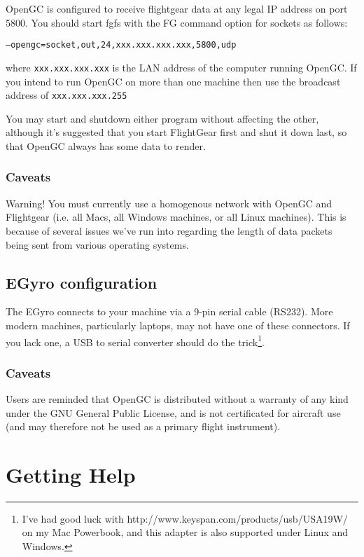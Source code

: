\documentclass[11pt]{article}
\begin{document}
OpenGC is configured to receive flightgear data at any legal IP address on port 5800. You should start fgfs with the FG command option for sockets as follows:

\begin{center} \texttt{--opengc=socket,out,24,xxx.xxx.xxx.xxx,5800,udp} \end{center}

\noindent where \texttt{xxx.xxx.xxx.xxx} is the LAN address of the computer running OpenGC. If you intend to run OpenGC on more than one machine then use the broadcast address of \texttt{xxx.xxx.xxx.255}

You may start and shutdown either program without affecting the other, although it's suggested that you start FlightGear first and shut it down last, so that OpenGC always has some data to render.

\subsubsection{Caveats}

Warning! You must currently use a homogenous network with OpenGC and Flightgear (i.e. all Macs, all Windows machines, or all Linux machines). This is because of several issues we've run into regarding the length of data packets being sent from various operating systems.

\subsection{EGyro configuration}

The EGyro connects to your machine via a 9-pin serial cable (RS232). More modern machines, particularly laptops, may not have one of these connectors. If you lack one, a USB to serial converter should do the trick\footnote{I've had good luck with http://www.keyspan.com/products/usb/USA19W/ on my Mac Powerbook, and this adapter is also supported under Linux and Windows.}.

\subsubsection{Caveats}

Users are reminded that OpenGC is distributed without a warranty of any kind under the GNU General Public License, and is not certificated for aircraft use (and may therefore not be used as a primary flight instrument).

\section{Getting Help}
\end{document}
